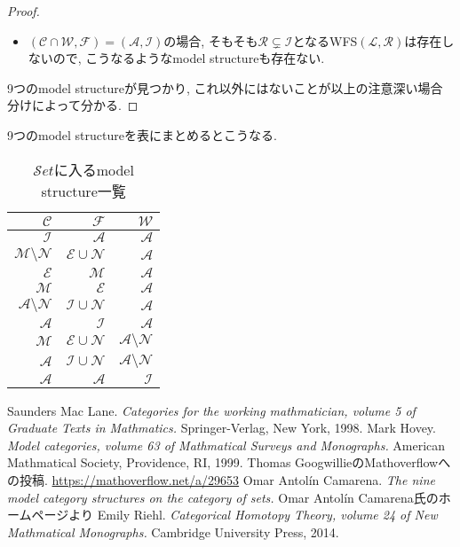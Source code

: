\documentclass[. /main]{subfiles}
\begin{document}
\begin{proof}
\begin{itemize}
\item $(\mathcal{C} \cap \mathcal{W},  \mathcal{F})=(\mathcal{A},  \mathcal{I})$の場合, そもそも$\mathcal{R} \subsetneq \mathcal{I}$となるWFS$(\mathcal{L},  \mathcal{R})$は存在しないので, こうなるようなmodel structureも存在ない. 
\end{itemize}
9つのmodel structureが見つかり, これ以外にはないことが以上の注意深い場合分けによって分かる. 
\end{proof}
9つのmodel structureを表にまとめるとこうなる. 
\begin{table}[hbtp]
\caption{$\mathcal{S}et$に入るmodel structure一覧}
\centering
\begin{tabular}{rrr}
\hline
$\mathcal{C}$& $\mathcal{F}$& $\mathcal{W}$\\
\hline \hline
$\mathcal{I}$& $\mathcal{A}$& $\mathcal{A}$\\
$\mathcal{M} \setminus \mathcal{N}$& $\mathcal{E} \cup \mathcal{N}$& $\mathcal{A}$\\
$\mathcal{E}$& $\mathcal{M}$& $\mathcal{A}$\\
$\mathcal{M}$& $\mathcal{E}$& $\mathcal{A}$\\
$\mathcal{A} \setminus \mathcal{N}$& $\mathcal{I} \cup \mathcal{N}$& $\mathcal{A}$\\
$\mathcal{A}$& $\mathcal{I}$& $\mathcal{A}$\\
$\mathcal{M}$& $\mathcal{E} \cup \mathcal{N}$& $\mathcal{A} \setminus \mathcal{N}$\\
$\mathcal{A}$& $\mathcal{I} \cup \mathcal{N}$& $\mathcal{A} \setminus \mathcal{N}$\\
$\mathcal{A}$& $\mathcal{A}$& $\mathcal{I}$\\
\hline
\end{tabular}
\end{table}

\begin{thebibliography}{9}
 Saunders Mac Lane.  
{\it Categories for the working mathmatician,  volume 5 of Graduate Texts in Mathmatics.}  Springer-Verlag,  New York,  1998. 
 Mark Hovey. 
{\it Model categories,  volume 63 of Mathmatical Surveys and Monographs.}  American Mathmatical Society,  Providence,  RI,  1999. 
 Thomas GoogwillieのMathoverflowへの投稿.  
  \url{https://mathoverflow.net/a/29653}
 Omar Antolín Camarena. 
{\it The nine model category structures on the category of sets. } Omar Antolín Camarena氏のホームページより
 Emily Riehl. 
{\it Categorical Homotopy Theory,  volume 24 of New Mathmatical Monographs.}  Cambridge University Press,  2014. 

\end{thebibliography}
\end{document}
